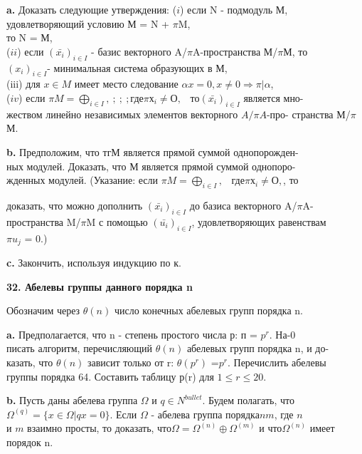\documentclass{../template/mai_book}
\begin{document}
\medskip

{\bf a.} Доказать следующие утверждения: 
($i$) если N - подмодуль М, удовлетворяющий условию М = N + $\pi$M,\\ 
то N = М,\\ 
($ii$) если $(\bar{x_i})_{i\in I}$ - базис векторного A/$\pi$A-пространства М/$\pi$М, то \\
$(x_i)_{i\in I}$- минимальная система образующих в М, \\
(iii) для $x\in M$ имеет место следование $ \alpha x=0,x\ne 0 \Rightarrow\pi|\alpha $, \\
($iv$) если $ \pi M = \bigoplus_{i\in I} ,\ ;\ ;\ ;\text{где} \pi х_i\ne О, \;\;\;\text{то} (\bar{x_i})_{i\in I}$ является 
мно-\\жеством линейно независимых элементов векторного $A/ \pi A$-про- 
странства М/$\pi$М.

\medskip

{\bf b.} Предположим, что тгМ является прямой суммой 
однопорожден-\\ных модулей. Доказать, что М является прямой суммой однопоро- \\
жденных модулей. (Указание: если $ \pi M = \bigoplus_{i\in I} ,\;\;\;\text{где} \pi х_i\ne О, $\;\;\;, то

\pagebreak

доказать, что можно дополнить  $(\bar{x_i})_{i\in I}$ до базиса векторного A/$\pi$A-\\ 
пространства M/$\pi$M с помощью  $(\bar{u_i})_{i\in I}$, удовлетворяющих равенствам \\
$\pi u_j$ = 0.) 


{\bf c.} Закончить, используя индукцию по к. 



{\noindent\bf32. Абелевы группы данного порядка n}

Обозначим через $\theta(n)$ число конечных абелевых групп порядка n. 


{\bf a.} Предполагается, что n - степень простого числа р: п = $p^r$. 
На-0\\
писать алгоритм, перечисляющий $\theta(n)$ абелевых групп порядка n, и 
до-\\
казать, что $\theta(n)$ зависит только от r: $\theta(p^r)$ =$p^r$. Перечислить абелевы \\
группы порядка 64. Составить таблицу р(r) для $1 \leqslant r \leqslant 20$. 



{\bf b.} Пусть даны абелева группа $\Omega$ и $ q \in N^{bullet}$. Будем полагать, что \\
$\Omega^{(q)}=\{ x\in\Omega|qx=0 \}$. Если $\Omega$ - абелева группа порядка$ nm$, где $n$\\
и $m$ взаимно просты, то доказать, что$\Omega=\Omega^{(n)} \oplus \Omega^{(m)}$ и что$\Omega^{(n)}$ имеет 
порядок n. 
\end{document}
